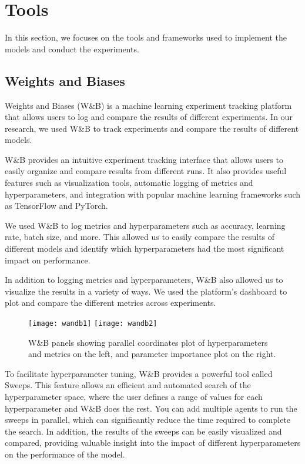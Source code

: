 \chapter{Tools}

In this section, we focuses on the tools and frameworks used to implement the models and conduct the experiments.

\section{Weights and Biases}

Weights and Biases (W\&B) \cite{wandb} is a machine learning experiment tracking platform that allows users to log and compare the results of different experiments. 
In our research, we used W\&B to track experiments and compare the results of different models.

W\&B provides an intuitive experiment tracking interface that allows users to easily organize and compare results from different runs.
It also provides useful features such as visualization tools, automatic logging of metrics and hyperparameters, and integration with popular machine learning frameworks such as TensorFlow and PyTorch.

We used W\&B to log metrics and hyperparameters such as accuracy, learning rate, batch size, and more. 
This allowed us to easily compare the results of different models and identify which hyperparameters had the most significant impact on performance.

In addition to logging metrics and hyperparameters, W\&B also allowed us to visualize the results in a variety of ways. 
We used the platform's dashboard to plot and compare the different metrics across experiments.

\begin{figure}[H]
  \centering
  \texttt{[image: wandb1]}
  \texttt{[image: wandb2]}
  \caption{W\&B panels showing parallel coordinates plot of hyperparameters and metrics on the left, and parameter importance plot on the right.}
\end{figure}


To facilitate hyperparameter tuning, W\&B provides a powerful tool called Sweeps.
This feature allows an efficient and automated search of the hyperparameter space, where the user defines a range of values for each hyperparameter and W\&B does the rest.
You can add multiple agents to run the sweeps in parallel, which can significantly reduce the time required to complete the search.
In addition, the results of the sweeps can be easily visualized and compared, providing valuable insight into the impact of different hyperparameters on the performance of the model.

